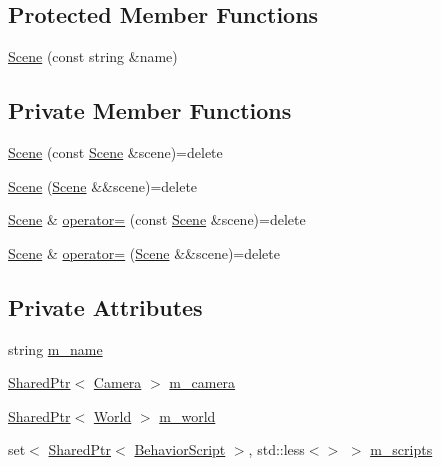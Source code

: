 \subsection*{Protected Member Functions}
\begin{DoxyCompactItemize}
\item 
\hyperlink{classmage_1_1_scene_aab61b38547fc53aa9c5b3b559f4d2e26}{Scene} (const string \&name)
\end{DoxyCompactItemize}
\subsection*{Private Member Functions}
\begin{DoxyCompactItemize}
\item 
\hyperlink{classmage_1_1_scene_a88d83ccb2e10549d5370f850b2b4c228}{Scene} (const \hyperlink{classmage_1_1_scene}{Scene} \&scene)=delete
\item 
\hyperlink{classmage_1_1_scene_a084284387b472f4eaf421509ef267b34}{Scene} (\hyperlink{classmage_1_1_scene}{Scene} \&\&scene)=delete
\item 
\hyperlink{classmage_1_1_scene}{Scene} \& \hyperlink{classmage_1_1_scene_a2c25c0fedc0230771d8c00a8288a69ce}{operator=} (const \hyperlink{classmage_1_1_scene}{Scene} \&scene)=delete
\item 
\hyperlink{classmage_1_1_scene}{Scene} \& \hyperlink{classmage_1_1_scene_a400926762670c9cd9b6d456291600f53}{operator=} (\hyperlink{classmage_1_1_scene}{Scene} \&\&scene)=delete
\end{DoxyCompactItemize}
\subsection*{Private Attributes}
\begin{DoxyCompactItemize}
\item 
string \hyperlink{classmage_1_1_scene_a6cc8cb08b1853c4e3063b33a94e8fb47}{m\+\_\+name}
\item 
\hyperlink{namespacemage_a1e01ae66713838a7a67d30e44c67703e}{Shared\+Ptr}$<$ \hyperlink{classmage_1_1_camera}{Camera} $>$ \hyperlink{classmage_1_1_scene_a961c280659f9934441d8e835508e933d}{m\+\_\+camera}
\item 
\hyperlink{namespacemage_a1e01ae66713838a7a67d30e44c67703e}{Shared\+Ptr}$<$ \hyperlink{classmage_1_1_world}{World} $>$ \hyperlink{classmage_1_1_scene_ab03b79c8ae30602fea1fabb84927a829}{m\+\_\+world}
\item 
set$<$ \hyperlink{namespacemage_a1e01ae66713838a7a67d30e44c67703e}{Shared\+Ptr}$<$ \hyperlink{classmage_1_1_behavior_script}{Behavior\+Script} $>$, std\+::less$<$$>$ $>$ \hyperlink{classmage_1_1_scene_a74ad0b8c6b085bd519de33da51ebb8dd}{m\+\_\+scripts}
\end{DoxyCompactItemize}


